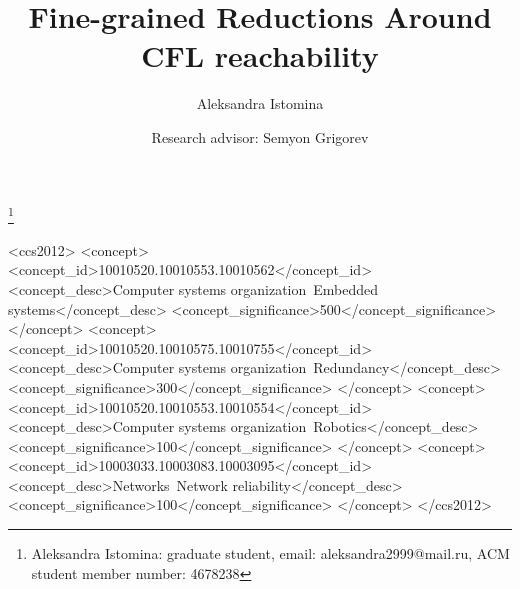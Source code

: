 \documentclass[acmsmall,review,nonacm]{acmart}\settopmatter{printfolios=true,printccs=false,printacmref=false}
\begin{document}
	
	\title{Fine-grained Reductions Around CFL reachability}
	
	\author{Aleksandra Istomina}
	\thanks{Aleksandra Istomina: graduate student, email: aleksandra2999@mail.ru, ACM student member number: 4678238}
	
	\author{Research advisor: Semyon Grigorev}
	
	\newcommand\todo[1]{{\color{violet}#1}}
	\newcommand\db[1]{{\color{red}#1}}
	\newcommand\question[1]{{\color{cyan}#1}}
	
	
	
	
	\begin{CCSXML}
		<ccs2012>
		<concept>
		<concept_id>10010520.10010553.10010562</concept_id>
		<concept_desc>Computer systems organization~Embedded systems</concept_desc>
		<concept_significance>500</concept_significance>
		</concept>
		<concept>
		<concept_id>10010520.10010575.10010755</concept_id>
		<concept_desc>Computer systems organization~Redundancy</concept_desc>
		<concept_significance>300</concept_significance>
		</concept>
		<concept>
		<concept_id>10010520.10010553.10010554</concept_id>
		<concept_desc>Computer systems organization~Robotics</concept_desc>
		<concept_significance>100</concept_significance>
		</concept>
		<concept>
		<concept_id>10003033.10003083.10003095</concept_id>
		<concept_desc>Networks~Network reliability</concept_desc>
		<concept_significance>100</concept_significance>
		</concept>
		</ccs2012>
	\end{CCSXML}
	
\end{document}

